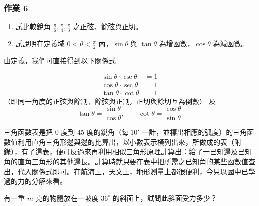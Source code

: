 \subsubsection*{作業 6}
\begin{enumerate}[label=\roman*), leftmargin=2.5em]
  \item 試比較銳角 $\frac{\pi}{6}, \frac{\pi}{4}, \frac{\pi}{3}$ 之正弦、餘弦與正切。
  \item 試說明在定義域 $0 < \theta < \frac{\pi}{2}$ 內，$\sin\theta$ 與 $\tan\theta$ 為增函數，$\cos\theta$ 為減函數。
\end{enumerate}

由定義，我們可直接得到以下關係式

\begin{proposition}
\begin{align*}
\sin\theta \cdot \csc\theta &= 1 \\
\cos\theta \cdot \sec\theta &= 1 \\
\tan\theta \cdot \cot\theta &= 1
\end{align*}
（即同一角度的正弦與餘割，餘弦與正割，正切與餘切互為倒數）
及
\[ \tan\theta = \frac{\sin\theta}{\cos\theta},\qquad \cot\theta = \frac{\cos\theta}{\sin\theta} \]
\end{proposition}

三角函數表是把 0 度到 45 度的銳角（每 $10'$ 一計，並標出相應的弧度）的三角函數值利用直角三角形邊與邊的比算出，以小數表示橫列出來，所做成的表（附錄），有了這表，便可反過來再利用相似三角形原理計算出：給了一已知邊及已知角的直角三角形的其他邊長。計算時就只要在表中把所需之已知角的某些函數值查出，代入關係式即可。在航海上，天文上，地形測量上都很便利，今只以國中已學過的力的分解來看。

\begin{example}
有一重 $m$ 克的物體放在一坡度 $36^\circ$ 的斜面上，試問此斜面受力多少？
\end{example}

